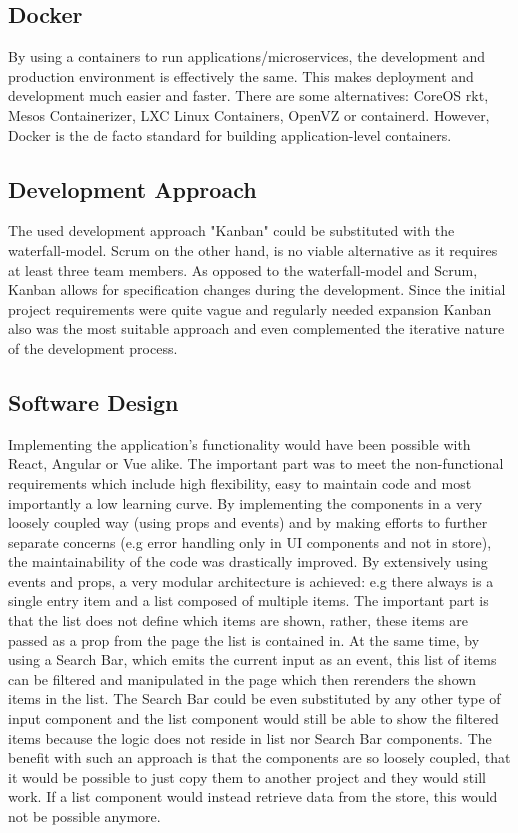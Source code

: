 \subsection{Docker}
By using a containers to run applications/microservices, the development and production environment is effectively the same. This makes deployment and development much easier and faster. There are some alternatives: CoreOS rkt, Mesos Containerizer, LXC Linux Containers, OpenVZ or containerd. However, Docker is the de facto standard for building application-level containers. 

\subsection{Development Approach}
The used development approach "Kanban" could be substituted with the waterfall-model. Scrum on the other hand, is no viable alternative as it requires at least three team members. As opposed to the waterfall-model and Scrum, Kanban allows for specification changes during the development. Since the initial project requirements were quite vague and regularly needed expansion Kanban also was the most suitable approach and even complemented the iterative nature of the development process.

\subsection{Software Design}
Implementing the application's functionality would have been possible with React, Angular or Vue alike. The important part was to meet the non-functional requirements which include high flexibility, easy to maintain code and most importantly a low learning curve. By implementing the components in a very loosely coupled way (using props and events) and by making efforts to further separate concerns (e.g error handling only in UI components and not in store), the maintainability of the code was drastically improved. By extensively using events and props, a very modular architecture is achieved: e.g there always is a single entry item and a list composed of multiple items. The important part is that the list does not define which items are shown, rather, these items are passed as a prop from the page the list is contained in. At the same time, by using a Search Bar, which emits the current input as an event, this list of items can be filtered and manipulated in the page which then rerenders the shown items in the list. The Search Bar could be even substituted by any other type of input component and the list component would still be able to show the filtered items because the logic does not reside in list nor Search Bar components. The benefit with such an approach is that the components are so loosely coupled, that it would be possible to just copy them to another project and they would still work. If a list component would instead retrieve data from the store, this would not be possible anymore.

